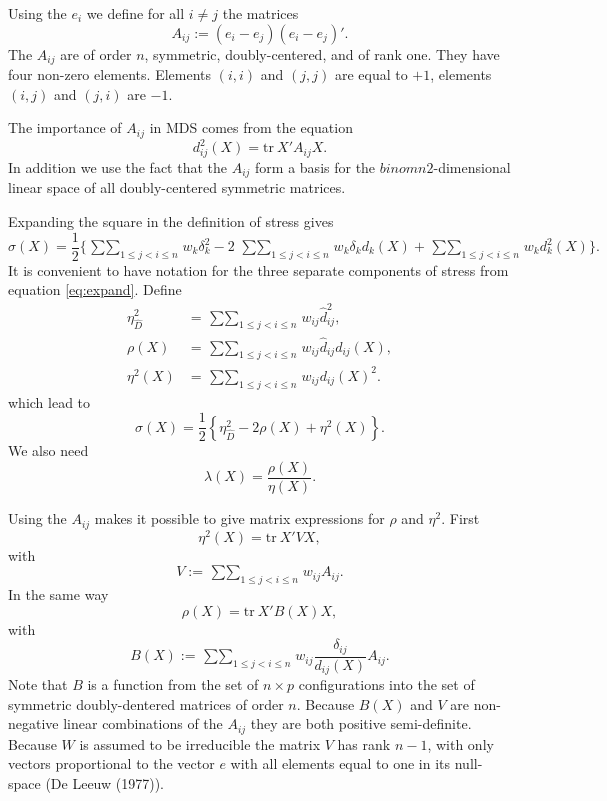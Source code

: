 \documentclass[
  12pt,
]{article}
\newcommand{\jis}{\mathop{\sum\sum}_{1\leq j<i\leq n}}
\begin{document}
Using the \(e_i\) we define for all \(i\not= j\) the matrices
\begin{equation}
A_{ij}:=(e_i-e_j)(e_i-e_j)'.
\end{equation} The \(A_{ij}\) are of order \(n\), symmetric, doubly-centered, and of rank one. They have four non-zero elements. Elements
\((i,i)\) and \((j,j)\) are equal to \(+1\), elements \((i,j)\) and \((j,i)\) are
\(-1\).

The importance of \(A_{ij}\) in MDS comes from the equation
\begin{equation}
d_{ij}^2(X)=\text{tr}\ X'A_{ij}X.
\label{eq:dfroma}
\end{equation}
In addition we use the fact that the \(A_{ij}\) form a basis for the \(binom{n}{2}\)-dimensional linear space of all doubly-centered
symmetric matrices.

Expanding the square in the definition of stress gives
\begin{equation}
\sigma(X)=\frac12\{\jis w_k\delta_k^2-2\ \jis w_k\delta_kd_k(X)+\jis w_kd_k^2(X)\}.
\label{eq:expand}
\end{equation}
It is convenient to have notation for the three separate
components of stress from equation \eqref{eq:expand}. Define
\begin{align}
\eta_{\hat D}^2&=\jis w_{ij}\hat d_{ij}^2,\label{eq:condef}\\
\rho(X)&=\jis w_{ij}\hat d_{ij}d_{ij}(X),\label{eq:rhodef}\\
\eta^2(X)&=\jis w_{ij}d_{ij}(X)^2.\label{eq:etadef}
\end{align} which lead to
\begin{equation}
\sigma(X)=\frac12\left\{\eta_{\hat D}^2-2\rho(X)+\eta^2(X)\right\}.
\label{eq:stressshort}
\end{equation}
We also need
\begin{equation}
\lambda(X)=\frac{\rho(X)}{\eta(X)}.
\label{eq:lambdadef}
\end{equation}

Using the \(A_{ij}\) makes it possible to give matrix expressions for \(\rho\)
and \(\eta^2\). First
\begin{equation}
\eta^2(X)=\text{tr}\ X'VX,
\label{eq:etamat}
\end{equation}
with
\begin{equation}
V:=\jis w_{ij}A_{ij}.
\label{eq:vdef}
\end{equation}
In the same way
\begin{equation}
\rho(X)=\text{tr}\ X'B(X)X,
\label{eq:rhomat}
\end{equation}
with
\begin{equation}
B(X):=\jis w_{ij}\frac{\delta_{ij}}{d_{ij}(X)}A_{ij}.
\label{eq:bdef}
\end{equation}
Note that \(B\) is a function from the set of \(n\times p\) configurations into the set of symmetric doubly-dentered matrices of order \(n\). Because \(B(X)\) and \(V\) are
non-negative linear combinations of the \(A_{ij}\) they are both positive semi-definite.
Because \(W\) is assumed to be irreducible the matrix \(V\) has rank \(n-1\), with only
vectors proportional to the vector \(e\) with all elements equal to one in its null-space (De Leeuw (1977)).
\end{document}
